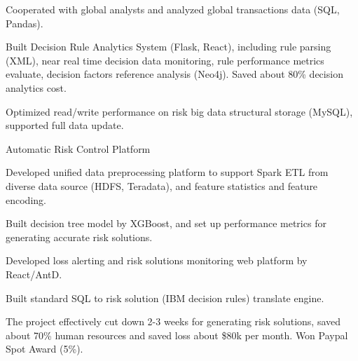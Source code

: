 \documentclass[11pt, a4paper, UTF8]{awesome-cv}
\begin{document}
\begin{cventries}
{\begin{cvitems}
        \item {Cooperated with global analysts and analyzed global transactions data (SQL, Pandas).}
        \item {Built Decision Rule Analytics System (Flask, React), including rule parsing (XML), near real time decision data monitoring, rule performance metrics evaluate, decision factors reference analysis (Neo4j). Saved about 80\% decision analytics cost.}
        \item {Optimized read/write performance on risk big data structural storage (MySQL), supported full data update.}
      \end{cvitems}
    }
    
  \cventry
    {Automatic Risk Control Platform} %
    {} %
    {} %
    {\ } %
    {
      \begin{cvitems} %
        \item {Developed unified data preprocessing platform to support Spark ETL from diverse data source (HDFS, Teradata), and feature statistics and feature encoding.}
        \item {Built decision tree model by XGBoost, and set up performance metrics for generating accurate risk solutions.}
        \item {Developed loss alerting and risk solutions monitoring web platform by React/AntD.}
        \item {Built standard SQL to risk solution (IBM decision rules) translate engine.}
        \item {The project effectively cut down 2-3 weeks for generating risk solutions, saved about 70\% human resources and saved loss about \$80k per month. Won Paypal Spot Award (5\%).}
      \end{cvitems}
    }


\end{cventries}
\end{document}
